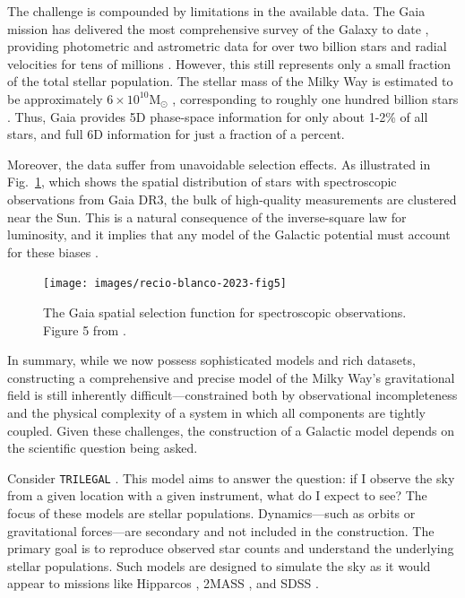         The challenge is compounded by limitations in the available data. The Gaia mission has delivered the most comprehensive survey of the Galaxy to date \citep{2023A&A...674A...1G}, providing photometric and astrometric data for over two billion stars and radial velocities for tens of millions \citep{2018A&A...616A..11G}. However, this still represents only a small fraction of the total stellar population. The stellar mass of the Milky Way is estimated to be approximately $6\times10^{10} \mathrm{M}_\odot$ \citep{2015ApJ...806...96L}, corresponding to roughly one hundred billion stars \citep[see also][]{2017MNRAS.465...76M}. Thus, Gaia provides 5D phase-space information for only about 1-2\% of all stars, and full 6D information for just a fraction of a percent.

        Moreover, the data suffer from unavoidable selection effects. As illustrated in Fig.~\ref{fig:gaia_selection_function}, which shows the spatial distribution of stars with spectroscopic observations from Gaia DR3, the bulk of high-quality measurements are clustered near the Sun. This is a natural consequence of the inverse-square law for luminosity, and it implies that any model of the Galactic potential must account for these biases \citep{2025A&A...695A.220K}.
        \begin{figure}
            \texttt{[image: images/recio-blanco-2023-fig5]}
            \caption{The Gaia spatial selection function for spectroscopic observations. Figure 5 from \citet{2023A&A...674A..38G}.}
            \label{fig:gaia_selection_function}
        \end{figure}

        In summary, while we now possess sophisticated models and rich datasets, constructing a comprehensive and precise model of the Milky Way's gravitational field is still inherently difficult—constrained both by observational incompleteness and the physical complexity of a system in which all components are tightly coupled. Given these challenges, the construction of a Galactic model depends on the scientific question being asked.

        Consider \texttt{TRILEGAL} \citep{2005A&A...436..895G}. This model aims to answer the question: if I observe the sky from a given location with a given instrument, what do I expect to see? The focus of these models are stellar populations. Dynamics—such as orbits or gravitational forces—are secondary and not included in the construction. The primary goal is to reproduce observed star counts and understand the underlying stellar populations. Such models are designed to simulate the sky as it would appear to missions like Hipparcos \citep{1997A&A...323L..49P}, 2MASS \citep{2006AJ....131.1163S}, and SDSS \citep{2000AJ....120.1579Y}.

